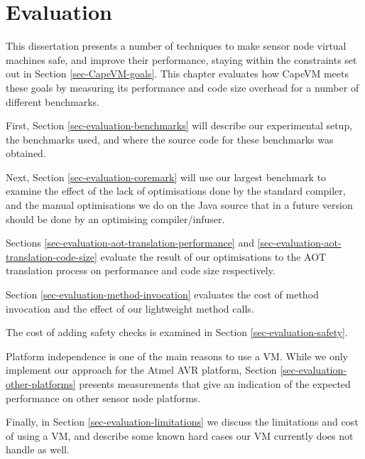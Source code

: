\chapter{Evaluation}
\label{sec-evaluation}
This dissertation presents a number of techniques to make sensor node virtual machines safe, and improve their performance, staying within the constraints set out in Section \ref{sec-CapeVM-goals}. This chapter evaluates how CapeVM meets these goals by measuring its performance and code size overhead for a number of different benchmarks.

First, Section \ref{sec-evaluation-benchmarks} will describe our experimental setup, the benchmarks used, and where the source code for these benchmarks was obtained.

Next, Section \ref{sec-evaluation-coremark} will use our largest benchmark to examine the effect of the lack of optimisations done by the standard  compiler, and the manual optimisations we do on the Java source that in a future version should be done by an optimising compiler/infuser.

Sections \ref{sec-evaluation-aot-translation-performance} and \ref{sec-evaluation-aot-translation-code-size} evaluate the result of our optimisations to the AOT translation process on performance and code size respectively.

Section \ref{sec-evaluation-method-invocation} evaluates the cost of method invocation and the effect of our lightweight method calls.

The cost of adding safety checks is examined in Section \ref{sec-evaluation-safety}.

Platform independence is one of the main reasons to use a VM. While we only implement our approach for the Atmel AVR platform, Section \ref{sec-evaluation-other-platforms} presents measurements that give an indication of the expected performance on other sensor node platforms.

Finally, in Section \ref{sec-evaluation-limitations} we discuss the limitations and cost of using a VM, and describe some known hard cases our VM currently does not handle as well.
